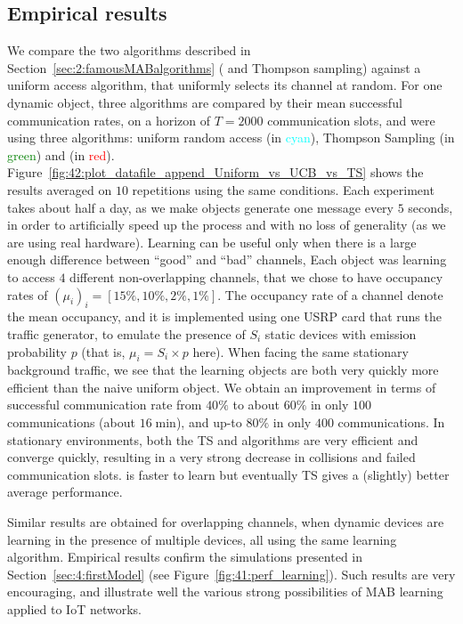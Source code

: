 \subsection{Empirical results}
\label{sub:42:results}

We compare the two algorithms described in Section~\ref{sec:2:famousMABalgorithms} (\UCB{} and Thompson sampling) against a uniform access algorithm, that uniformly selects its channel at random.
For one dynamic object, three algorithms are compared by their mean successful communication rates, on a horizon of $T=2000$ communication slots, and were using three algorithms: uniform random access (in \textcolor{cyan}{cyan}), Thompson Sampling (in \textcolor{green}{green}) and \UCB{} (in \textcolor{red}{red}).
Figure~\ref{fig:42:plot_datafile_append_Uniform_vs_UCB_vs_TS} shows the results averaged on $10$ repetitions using the same conditions.
%
Each experiment takes about half a day,
as we make objects generate one message every $5$ seconds, in order to artificially speed up the process and with no loss of generality (as we are using real hardware).
Learning can be useful only when there is a large enough difference between ``good'' and ``bad'' channels,
Each object was learning to access $4$ different non-overlapping channels, that we chose to have occupancy rates of $(\mu_i)_i = [15\%, 10\%, 2\%, 1\%]$.
The occupancy rate of a channel denote the mean occupancy, and it is implemented using one USRP card that runs the traffic generator, to emulate the presence of $S_i$ static devices with emission probability $p$ (that is, $\mu_i = S_i \times p$ here).
When facing the same stationary background traffic, we see that the learning objects are both very quickly more efficient than the naive uniform object.
We obtain an improvement in terms of successful communication rate from $40\%$ to about $60\%$ in only $100$ communications (about $16\;\mathrm{min}$), and up-to $80\%$ in only $400$ communications.
%
In stationary environments, both the TS and \UCB{} algorithms are very efficient and converge quickly, resulting in a very strong decrease in collisions and failed communication slots. \UCB{} is faster to learn but eventually TS gives a (slightly) better average performance.

Similar results are obtained for overlapping channels, when dynamic devices are learning in the presence of multiple devices, all using the same learning algorithm.
Empirical results confirm the simulations presented in Section~\ref{sec:4:firstModel} (see Figure~\ref{fig:41:perf_learning}).
Such results are very encouraging, and illustrate well the various strong possibilities of MAB learning applied to IoT networks.


